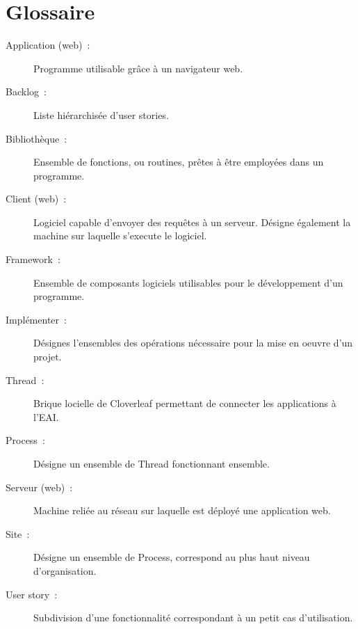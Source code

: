 \chapter*{Glossaire}
	\begin{description}
		\item[Application (web)~:] Programme utilisable grâce à un navigateur web.
		\item[Backlog~:] Liste hiérarchisée d'user stories.
		\item[Bibliothèque~:] Ensemble de fonctions, ou routines, prêtes à être
		employées dans un programme.
		\item[Client (web)~:] Logiciel capable d'envoyer des requêtes à un serveur.
		Désigne également la machine sur laquelle s'execute le logiciel.
		\item[Framework~:] Ensemble de composants logiciels utilisables pour le
		développement d'un programme.
		\item[Implémenter~:] Désignes l'ensembles des opérations nécessaire pour la
		mise en oeuvre d'un projet.
		\item[Thread~:] Brique locielle de Cloverleaf permettant de connecter les
		applications à l'EAI.
		\item[Process~:] Désigne un ensemble de Thread fonctionnant ensemble.
		\item[Serveur (web)~:] Machine reliée au réseau sur laquelle est déployé une
		application web.
		\item[Site~:] Désigne un ensemble de Process, correspond au plus haut niveau
		d'organisation.
		\item[User story~:] Subdivision d'une fonctionnalité correspondant à un petit
		cas d'utilisation.
	\end{description}